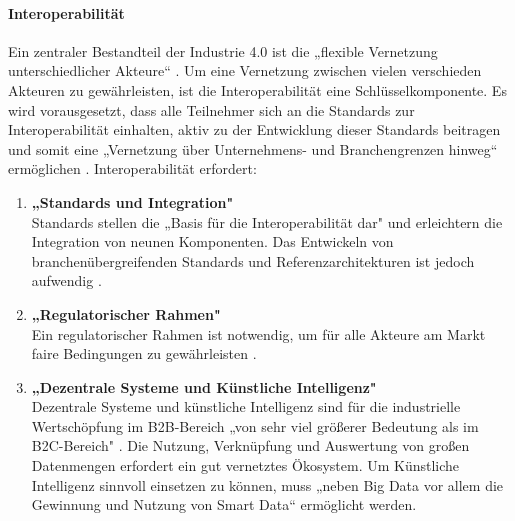\paragraph{Interoperabilität}\label{sec:Interoperabilität}
\noindent Ein zentraler Bestandteil der Industrie 4.0 ist die „flexible Vernetzung unterschiedlicher Akteure“ \cite[S.5]{3}. Um eine Vernetzung zwischen vielen verschieden Akteuren zu gewährleisten, ist die Interoperabilität eine Schlüsselkomponente. Es wird vorausgesetzt, dass alle Teilnehmer sich an die Standards zur Interoperabilität einhalten, aktiv zu der Entwicklung dieser Standards beitragen und somit eine „Vernetzung über Unternehmens- und Branchengrenzen hinweg“ \cite[S.5]{3} ermöglichen \cite[S.5]{3}. Interoperabilität erfordert:
\begin{enumerate}
	\item \textbf{„Standards und Integration"} \cite[S.5]{3} \\
	Standards stellen die „Basis für die Interoperabilität dar" \cite[S.5]{3} und erleichtern die Integration von neunen Komponenten. Das Entwickeln von branchenübergreifenden Standards und
	Referenzarchitekturen ist jedoch aufwendig \cite[S.5]{3}.
	\item \textbf{„Regulatorischer Rahmen"} \cite[S.5]{3} \\
	Ein regulatorischer Rahmen ist notwendig, um für alle Akteure am Markt faire Bedingungen zu gewährleisten \cite[S.5]{3}.
	\item \textbf{„Dezentrale Systeme und Künstliche Intelligenz"} \cite[S.5]{3} \\
	Dezentrale Systeme und künstliche Intelligenz sind für die industrielle Wertschöpfung im 
	B2B-Bereich „von sehr viel größerer Bedeutung als im B2C-Bereich" \cite[S.5]{3}. Die Nutzung,
	Verknüpfung und Auswertung von großen Datenmengen erfordert ein gut vernetztes Ökosystem. Um Künstliche Intelligenz sinnvoll einsetzen zu können, muss „neben Big Data vor allem die Gewinnung und Nutzung von Smart Data“ \cite[S.5]{3} ermöglicht werden.
\end{enumerate}

